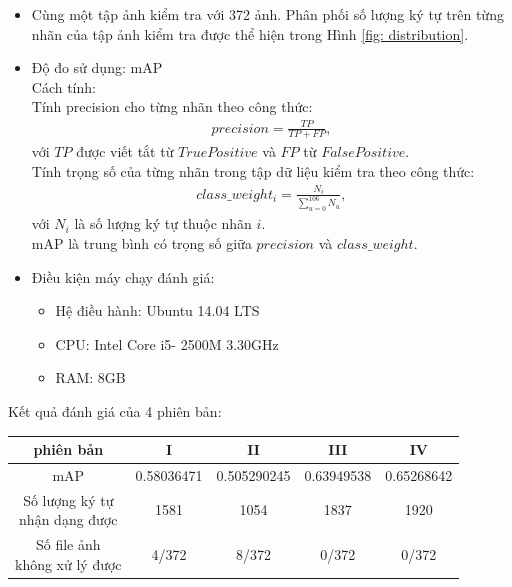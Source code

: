 \documentclass[a4paper,12pt]{article}
\begin{document}
	\begin{itemize}
		\item Cùng một tập ảnh kiểm tra với 372 ảnh. Phân phối số lượng ký tự trên từng nhãn của tập ảnh kiểm tra được thể hiện trong Hình \ref{fig: distribution}.
		\item Độ đo sử dụng: mAP\\
		Cách tính:\\ Tính precision cho từng nhãn theo công thức\cite{mAP}:
		\begin{align}
		precision = \frac{TP}{TP+FP},
		\end{align}
		\hspace{2cm}với $TP$ được viết tắt từ $True Positive$\cite{mAP} và $FP$ từ $False Positive$\cite{mAP}.\\
		Tính trọng số của từng nhãn trong tập dữ liệu kiểm tra theo công thức:
		\begin{align}
		class\_weight_i = \frac{N_i}{\sum_{u=0}^{106}N_u},
		\end{align}
		\hspace{2cm}với $N_i$ là số lượng ký tự thuộc nhãn $i$.\\
		mAP là trung bình có trọng số giữa $precision$ và $class\_weight$.
		\item Điều kiện máy chạy đánh giá:
		\begin{itemize}
			\item Hệ điều hành: Ubuntu 14.04 LTS
			\item CPU: Intel Core i5- 2500M 3.30GHz 
			\item RAM: 8GB
		\end{itemize}
	\end{itemize}
	Kết quả đánh giá của 4 phiên bản:
	\vspace{0.5cm}
	\begin{center}
		\begin{tabular}{||c | c | c | c | c||} 
			\hline
			phiên bản & I&II&III&IV\\[0.5ex] 
			\hline\hline
			mAP&0.58036471&0.505290245&0.63949538&0.65268642\\
			\hline
			\makecell{Số lượng ký tự\\ nhận dạng được}&1581&1054&1837&1920\\
			\hline
			\makecell{Số file ảnh\\ không xử lý được}&4/372&8/372&0/372&0/372\\
			\hline
		\end{tabular}
	\end{center}
\end{document}
